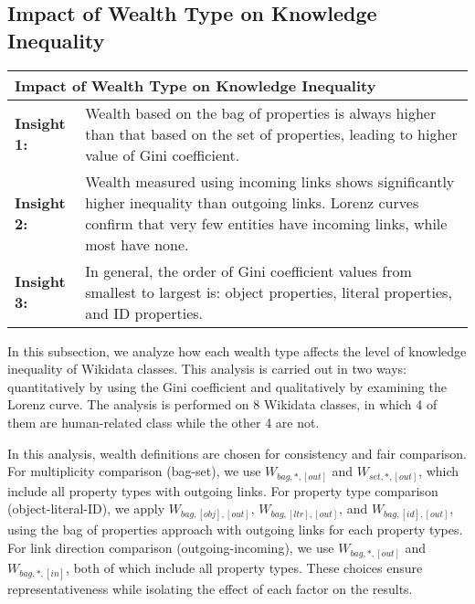 \subsection{Impact of Wealth Type on Knowledge Inequality} \label{wealth & gini}

% 
% 
% 

\begin{table}[!htbp]
    \centering
    \renewcommand{\arraystretch}{1.3}
    \begin{tabular}{|l p{12cm}|} 
        \hline
        \multicolumn{2}{|l|}{\textbf{Impact of Wealth Type on Knowledge Inequality}} \\
        \hline
        \textbf{Insight 1:} & Wealth based on the bag of properties is always higher than that based on the set of properties, leading to higher value of Gini coefficient. \\
        \textbf{Insight 2:} & Wealth measured using incoming links shows significantly higher inequality than outgoing links. Lorenz curves confirm that very few entities have incoming links, while most have none. \\
        \textbf{Insight 3:} & In general, the order of Gini coefficient values from smallest to largest is: object properties, literal properties, and ID properties. \\
        \hline
    \end{tabular}
\end{table}

In this subsection, we analyze how each wealth type affects the level of knowledge inequality of Wikidata classes. This analysis is carried out in two ways: quantitatively by using the Gini coefficient and qualitatively by examining the Lorenz curve. The analysis is performed on 8 Wikidata classes, in which 4 of them are human-related class while the other 4 are not.

In this analysis, wealth definitions are chosen for consistency and fair comparison. For multiplicity comparison (bag-set), we use \(W_{bag,*,[out]}\) and \(W_{set,*,[out]}\), which include all property types with outgoing links. For property type comparison (object-literal-ID), we apply \(W_{bag,[obj],[out]}\), \(W_{bag,[ltr],[out]}\), and \(W_{bag,[id],[out]}\), using the bag of properties approach with outgoing links for each property types. For link direction comparison (outgoing-incoming), we use \(W_{bag,*,[out]}\) and \(W_{bag,*,[in]}\), both of which include all property types. These choices ensure representativeness while isolating the effect of each factor on the results.

